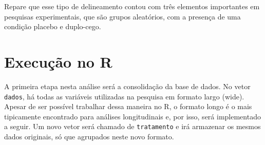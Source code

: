 \documentclass[
]{book}
\newenvironment{Shaded}{\begin{snugshade}}{\end{snugshade}}
\newcommand{\DataTypeTok}[1]{\textcolor[rgb]{0.13,0.29,0.53}{#1}}
\newcommand{\DecValTok}[1]{\textcolor[rgb]{0.00,0.00,0.81}{#1}}
\newcommand{\KeywordTok}[1]{\textcolor[rgb]{0.13,0.29,0.53}{\textbf{#1}}}
\newcommand{\NormalTok}[1]{#1}
\newcommand{\OperatorTok}[1]{\textcolor[rgb]{0.81,0.36,0.00}{\textbf{#1}}}
\newcommand{\StringTok}[1]{\textcolor[rgb]{0.31,0.60,0.02}{#1}}
\begin{document}
Repare que esse tipo de delineamento contou com três elementos
importantes em pesquisas experimentais, que são grupos aleatórios, com a
presença de uma condição placebo e duplo-cego.

\hypertarget{execuuxe7uxe3o-no-r-10}{%
\section{Execução no R}\label{execuuxe7uxe3o-no-r-10}}

A primeira etapa nesta análise será a consolidação da base de dados. No
vetor \texttt{dados}, há todas as variáveis utilizadas na pesquisa em
formato largo (wide). Apesar de ser possível trabalhar dessa maneira no
R, o formato longo é o mais tipicamente encontrado para análises
longitudinais e, por isso, será implementado a seguir. Um novo vetor
será chamado de \texttt{tratamento} e irá armazenar os mesmos dados
originais, só que agrupados neste novo formato.

\begin{Shaded}
\end{Shaded}
\end{document}
